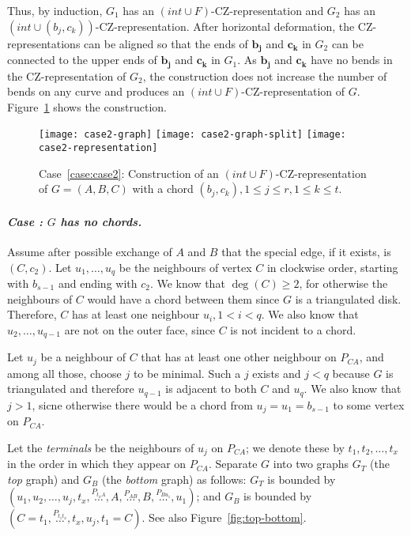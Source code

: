 \documentclass{article}
\renewcommand{\int}[1]{$(\mathit{int}\cup{#1})$}
\newcounter{thecase} \setcounter{thecase}{0}
\newcommand{\case}[1]{\noindent
            \refstepcounter{thecase}\paragraph*{\textnormal{\textit{Case \arabic{thecase}: #1}}}
}
\newcommand{\bb}[1]{\ensuremath{\mathbf{#1}}}
\begin{document}
Thus, by induction, $G_1$ has an \int{F}-CZ-representation and $G_2$ has
an \int{(b_j,c_k)}-CZ-representation. 
After horizontal deformation, the CZ-representations can be aligned 
so that the ends of $\bb{b_j}$ and $\bb{c_k}$ in $G_2$ can be connected to the upper ends of $\bb{b_j}$
and $\bb{c_k}$ in $G_1$. 
As $\bb{b_j}$ and $\bb{c_k}$ have no bends in the CZ-representation of $G_2$, the
construction does not increase the number of bends on any curve and produces 
an \int{F}-CZ-representation of $G$. 
Figure~\ref{fig:case2-construction} shows the construction. 


\begin{figure}
\begin{center}
\texttt{[image: case2-graph]}\hspace{2em}
\texttt{[image: case2-graph-split]}\hspace{3em}
\texttt{[image: case2-representation]}
\end{center}
\caption{Case~\ref{case:case2}: Construction of an \int{F}-CZ-representation of $G = (A,B,C)$
    with a chord $(b_j,c_k), 1 \leq j \leq r, 1 \leq k \leq t$.}
\label{fig:case2-construction}
\end{figure}


\case{$G$ has no chords.}
\label{case:chordless}
Assume after possible exchange of $A$ and $B$ that the special edge, if it exists, is $(C,c_2)$.
Let $u_1,\dots,u_q$ be the neighbours of vertex $C$ in clockwise order, starting
with $b_{s-1}$ and ending with $c_2$.  We know that $\deg(C)\geq 2$, for
otherwise the neighbours of $C$ would have a chord between them since $G$ is a 
triangulated disk.  Therefore, $C$ has at least one neighbour
$u_i, 1 < i < q$.  We also know that $u_2,\dots,u_{q-1}$ are not on the outer 
face, since $C$ is not incident to a chord.

Let $u_j$ be a neighbour of $C$ that has at least one other neighbour on 
$P_{CA}$, and among all those, choose $j$ to be minimal. Such a
$j$ exists and $j<q$  because $G$ is triangulated and 
therefore $u_{q-1}$ is adjacent to both $C$ and $u_q$.   
We also know that $j>1$, sicne otherwise there would be a chord from
$u_j=u_1=b_{s-1}$ to some vertex on $P_{CA}$.

Let the {\em terminals} be the neighbours of $u_j$
on $P_{CA}$; we denote these by $t_1,t_2,\dots,t_x$ in the order in which
they appear on $P_{CA}$. 
Separate $G$ into two graphs $G_T$ (the \emph{top} graph) and $G_B$ (the \emph{bottom} graph) as follows: $G_T$ is bounded 
by $(u_1, u_2, \ldots, u_j, t_x, \stackrel{P_{t_xA}}{\ldots}, A, \stackrel{P_{AB}}{\ldots}, B, \stackrel{P_{Bu_1}}{\ldots}, u_1)$;
and $G_B$ is bounded by $(C = t_1, \stackrel{P_{t_1t_x}}{\ldots}, t_x, u_j, t_1 = C)$. See also Figure~\ref{fig:top-bottom}.
\end{document}
